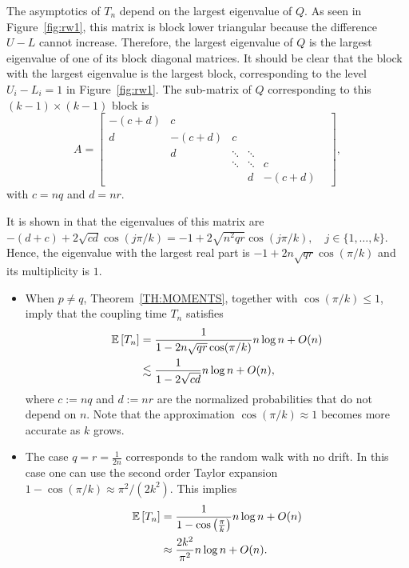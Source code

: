\documentclass{aptpub}
\newcommand\expect[1]{\mathchoice{\bexpect{#1}}{\sexpect{#1}}{\sexpect{#1}}{\sexpect{#1}}}
\newcommand\bexpect[1]{\mathbb{E}\left[#1\right]}
\newcommand\sexpect[1]{\mathbb{E}[#1]}
\newcommand\p[1]{\left(#1\right)}
\newcommand{\bydef}{:=}
\begin{document}
The asymptotics of $T_n$ depend on the largest eigenvalue of $Q$.  As
seen in Figure~\ref{fig:rw1}, this matrix is block lower triangular
because the difference $U - L$ cannot increase.  Therefore, the
largest eigenvalue of $Q$ is the largest eigenvalue of one of its
block diagonal matrices.  It should be clear that the block with the
largest eigenvalue is the  largest block, corresponding to the
level $U_i - L_i = 1$ in Figure~\ref{fig:rw1}.  The sub-matrix of $Q$
corresponding to this $(k-1)\times (k-1)$ block is
\begin{equation}
  {A} = %
  \begin{bmatrix}%
    -(c+d) & c & & & \\ %
    d & -(c+d) & c & & & \\ %
    & d & \ddots & \ddots &\\
     & & \ddots & \ddots & c\\
     &  & & d & -(c+d)
  \end{bmatrix},
\label{eq:block}
\end{equation}
with $c=nq$ and $d=nr$.


It is shown in \cite{kulkarni1999eigenvalues} that the eigenvalues of
this matrix are
$-(d+c)+2\sqrt{cd}\cos(j\pi/k) = -1+2\sqrt{n^2qr}\cos(j\pi/k), \quad j \in \{1,\ldots,k\}$.
Hence, the eigenvalue with the largest real part is
$-1+2n\sqrt{qr}\cos(\pi/k)$ and its  multiplicity is $1$.
\begin{itemize}
\item When $p \not=q$, Theorem~\ref{TH:MOMENTS}, together with
  $\cos(\pi/k)\le1$, imply that the coupling time $T_n$ satisfies
  \begin{align*}
    \expect{T_n} & =   \frac{1}{1-2n\sqrt{qr}\cos(\pi/k)}n\log n +
                   O(n)\\
                 & \lesssim  \frac{1}{1-2\sqrt{cd}} n \log n + O(n),
  \end{align*}
  where $c \bydef nq$ and $d \bydef nr$ are the normalized
  probabilities that do not depend on $n$.  Note that the
  approximation $\cos(\pi/k)\approx1$ becomes more accurate as $k$
  grows.
  
\item The case $q=r=\frac{1}{2n}$ corresponds to the random walk with
  no drift.  In this case one can use the second order Taylor
  expansion $1-\cos(\pi/k)\approx\pi^2/(2k^2)$.  This implies
  \begin{align*}
    \expect{T_n} & =   \frac{1}{1-\cos\p{\frac{\pi}{k}}}n\log n + O(n) \\
                 &\approx \frac{2k^2}{\pi^2} n\log n + O(n).
  \end{align*}
\end{itemize}
\end{document}
